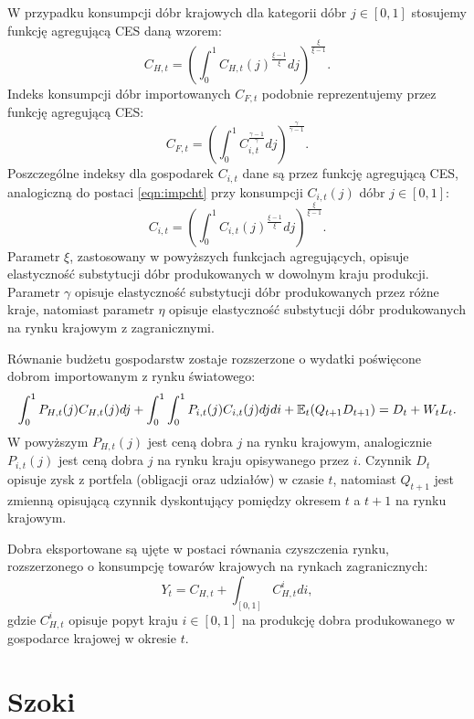 W przypadku konsumpcji dóbr krajowych dla kategorii dóbr $j \in [0,1]$ stosujemy funkcję agregującą CES daną wzorem:
\begin{equation}
    \label{eqn:impcht}
    C_{H,t} = (\int^1_0 C_{H,t}(j)^{\frac{\xi - 1}{\xi}}dj)^{\frac{\xi}{\xi - 1}}.
\end{equation}
Indeks konsumpcji dóbr importowanych $C_{F,t}$ podobnie reprezentujemy przez funkcję agregującą CES:
\begin{equation}
    C_{F,t} = (\int^1_0 C_{i,t}^{\frac{\gamma - 1}{\gamma}}dj)^{\frac{\gamma}{\gamma - 1}}.
\end{equation}
Poszczególne indeksy dla gospodarek $C_{i,t}$ dane są przez funkcję agregującą CES, analogiczną do postaci \eqref{eqn:impcht} przy konsumpcji $C_{i,t}(j)$ dóbr $j \in [0,1]$:
\begin{equation}
    C_{i,t} = (\int^1_0 C_{i,t}(j)^{\frac{\xi - 1}{\xi}}dj)^{\frac{\xi}{\xi - 1}}.
\end{equation}
Parametr $\xi$, zastosowany w powyższych funkcjach agregujących, opisuje elastyczność substytucji dóbr produkowanych w dowolnym kraju produkcji. Parametr $\gamma$ opisuje elastyczność substytucji dóbr produkowanych przez różne kraje, natomiast parametr $\eta$ opisuje elastyczność substytucji dóbr produkowanych na rynku krajowym z zagranicznymi.

Równanie budżetu gospodarstw zostaje rozszerzone o wydatki poświęcone dobrom importowanym z rynku światowego:
\begin{equation}
    \int_0^1 P_{H,t}(j)C_{H,t}(j)dj + \int_0^1\int_0^1 P_{i,t}(j)C_{i,t}(j) dj di + \mathbb{E}_t (Q_{t+1} D_{t+1}) 
    = D_t + W_t L_t.
\end{equation}
W powyższym $P_{H,t}(j)$ jest ceną dobra $j$ na rynku krajowym, analogicznie $P_{i,t}(j)$ jest ceną dobra $j$ na rynku kraju opisywanego przez $i$. Czynnik $D_t$ opisuje zysk z portfela (obligacji oraz udziałów) w czasie $t$, natomiast $Q_{t+1}$ jest zmienną opisującą czynnik dyskontujący pomiędzy okresem $t$ a $t+1$ na rynku krajowym.
 
Dobra eksportowane są ujęte w postaci równania czyszczenia rynku, rozszerzonego o konsumpcję towarów krajowych na rynkach zagranicznych:
\begin{equation}
    Y_t = C_{H,t} + \int_{[0,1]} C^i_{H,t} di,
\end{equation}
gdzie $C^i_{H,t}$ opisuje popyt kraju $i \in [0,1]$ na produkcję dobra produkowanego w gospodarce krajowej w okresie $t$.

\section{Szoki}
\label{sec:shocks}


